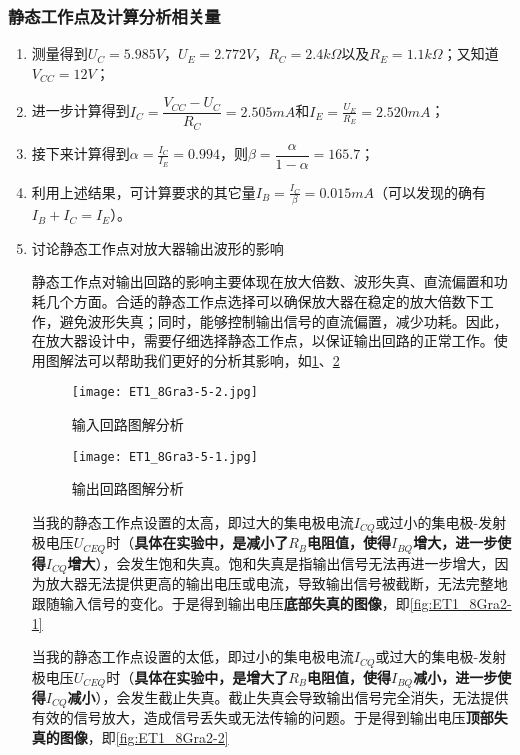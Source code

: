 \documentclass[dvipsnames, svgnames,a4paper,11pt]{article}
\begin{document}
	\subsubsection{静态工作点及计算分析相关量}
	\begin{enumerate}
		\item 测量得到$U_C=5.985V$，$U_E=2.772V$，$R_C=2.4k\Omega$以及$R_E=1.1k\Omega$；又知道$V_{CC}=12V$；
		\item 进一步计算得到$I_C=\dfrac{V_{CC}-U_C}{R_C}=2.505mA$和$I_E=\frac{U_E}{R_E}=2.520mA$；
		\item 接下来计算得到$\alpha=\frac{I_C}{I_E}=0.994$，则$\beta=\dfrac{\alpha}{1-\alpha}=165.7$；
		\item 利用上述结果，可计算要求的其它量$I_B=\frac{I_C}{\beta}=0.015mA$（可以发现的确有$I_B+I_C=I_E$）。
		\item 讨论静态工作点对放大器输出波形的影响

			静态工作点对输出回路的影响主要体现在放大倍数、波形失真、直流偏置和功耗几个方面。合适的静态工作点选择可以确保放大器在稳定的放大倍数下工作，避免波形失真；同时，能够控制输出信号的直流偏置，减少功耗。因此，在放大器设计中，需要仔细选择静态工作点，以保证输出回路的正常工作。使用图解法可以帮助我们更好的分析其影响，如\cref{fig:fig3-5-2}、\cref{fig:fig3-5-1}


			\begin{figure}[htbp]
				\centering
				\texttt{[image: ET1\_8Gra3-5-2.jpg]}
				\caption{输入回路图解分析}
				\label{fig:fig3-5-2}
			\end{figure}

			\begin{figure}[htbp]
				\centering
				\texttt{[image: ET1\_8Gra3-5-1.jpg]}
				\caption{输出回路图解分析}
				\label{fig:fig3-5-1}
			\end{figure}

			当我的静态工作点设置的太高，即过大的集电极电流$I_{CQ}$或过小的集电极-发射极电压$U_{CEQ}$时（\textbf{具体在实验中，是减小了$R_B$电阻值，使得$I_{BQ}$增大，进一步使得$I_{CQ}$增大}），会发生饱和失真。饱和失真是指输出信号无法再进一步增大，因为放大器无法提供更高的输出电压或电流，导致输出信号被截断，无法完整地跟随输入信号的变化。于是得到输出电压\textbf{底部失真的图像}，即\cref{fig:ET1_8Gra2-1}

			当我的静态工作点设置的太低，即过小的集电极电流$I_{CQ}$或过大的集电极-发射极电压$U_{CEQ}$时（\textbf{具体在实验中，是增大了$R_B$电阻值，使得$I_{BQ}$减小，进一步使得$I_{CQ}$减小}），会发生截止失真。截止失真会导致输出信号完全消失，无法提供有效的信号放大，造成信号丢失或无法传输的问题。于是得到输出电压\textbf{顶部失真的图像}，即\cref{fig:ET1_8Gra2-2}
	\end{enumerate}
	
\end{document}
